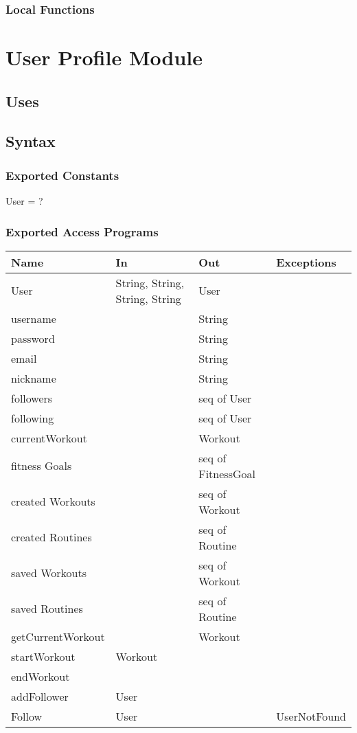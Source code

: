\documentclass[12pt, titlepage]{article}
\begin{document}
\subsubsection{Local Functions}

\newpage

\section{User Profile Module}

\subsection{Uses}

\subsection{Syntax}

\subsubsection{Exported Constants}
User = ?
\subsubsection{Exported Access Programs}

\begin{center}
	\begin{tabular}{p{4cm} p{4cm} p{3cm} p{2cm}}
		\hline
		\textbf{Name} & \textbf{In} & \textbf{Out} & \textbf{Exceptions} \\
		\hline
		User & String, String, String, String & User &  \\
		username &  & String &  \\
 		password &  & String &  \\
 		email &  & String &  \\
 		nickname &  & String &  \\
 		followers &  & seq of User &  \\
 		following &  & seq of User &  \\
 		currentWorkout &  & Workout &  \\
 		fitness Goals &  & seq of FitnessGoal &  \\
 		created Workouts &  & seq of Workout &  \\
 		created Routines &  & seq of Routine &  \\
 		saved Workouts &  & seq of Workout &  \\
 		saved Routines &  & seq of Routine &  \\
 		getCurrentWorkout &  & Workout &  \\
 		startWorkout & Workout &  &  \\
 		endWorkout & &  &  \\
 		addFollower & User & &  \\
 		Follow & User & & UserNotFound \\
		\hline
	\end{tabular}
\end{center}
\end{document}

